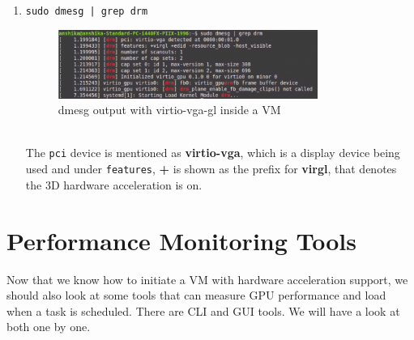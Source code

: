 \documentclass[a4paper,12pt, final]{report}
\begin{document}
\begin{enumerate}
    \item \texttt{sudo dmesg | grep drm}\\
            \begin{figure}[H]
                \centering
                \includegraphics[width=0.8\textwidth]{images/dmesg.png}
                \caption{dmesg output with virtio-vga-gl inside a VM}
                \label{fig:dmesg_hw_accel_vm}
            \end{figure}\\
            The \verb|pci| device is mentioned as \textbf{virtio-vga}, which is a display device being used and under \verb|features|, \textbf{+} is shown as the prefix for \textbf{virgl}, that denotes the 3D hardware acceleration is on.
\end{enumerate}

\section{Performance Monitoring Tools}
Now that we know how to initiate a VM with hardware acceleration support, we should also look at some tools that can measure GPU performance and load when a task is scheduled. There are CLI and GUI tools. We will have a look at both one by one.
\end{document}

